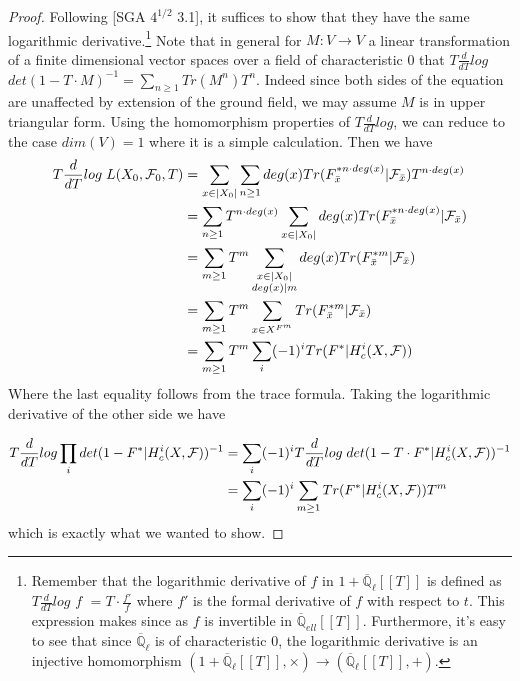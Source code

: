 \documentclass{ucbthesis}
\theoremstyle{definition}
\theoremstyle{theorem}
\begin{document}
\begin{proof}
Following [SGA $4^{1/2}$ 3.1], it suffices to show that they have the same logarithmic derivative.\footnote{Remember that the logarithmic derivative of $f$ in $1+\overline{\mathbb{Q}}_{\ell}[[T]]$ is defined as $T \frac{d}{dT}log$ $f$ $=T\cdot \frac{f'}{f}$ where $f'$ is the formal derivative of $f$ with respect to $t$. This expression makes since as $f$ is invertible in $\overline{\mathbb{Q}}_{ell}[[T]]$. Furthermore, it's easy to see that since $\overline{\mathbb{Q}}_{\ell}$ is of characteristic $0$, the logarithmic derivative is an injective homomorphism $(1+\overline{\mathbb{Q}}_{\ell}[[T]],\times) \rightarrow (\overline{\mathbb{Q}}_{\ell}[[T]],+)$.}
Note that in general for $M:V\rightarrow V$ a linear transformation of a finite dimensional vector spaces over a field of characteristic $0$ that  
$T \frac{d}{dT}log$ $det(1-T\cdot M)^{-1} = \sum\limits_{n \geq 1}Tr(M^{n})T^{n}$. Indeed since both sides of the equation are unaffected by extension of the ground field, we may assume $M$ is in upper triangular form. Using the homomorphism properties of $T \frac{d}{dT}log$, we can reduce to the case $dim(V) =1$ where it is a simple calculation. Then we have
\begin{align*}
T \frac{d}{dT}log \hspace{1mm} L(X_{0},\mathcal{F}_0,T) & = \sum\limits_{x\in |X_0|}\sum\limits_{n\geq 1}deg(x)Tr(F_{\bar{x}}^{*n\cdot deg(x)}|\mathcal{F}_{\bar{x}})T^{n\cdot deg(x)} \\
& = \sum\limits_{n\geq 1}T^{n\cdot deg(x)}\sum\limits_{x\in |X_{0}|}deg(x)Tr(F_{\bar{x}}^{*n\cdot deg(x)}|\mathcal{F}_{\bar{x}})\\
& = \sum\limits_{m\geq 1}T^{m}\sum\limits_{\substack{x\in |X_{0}|\\ deg(x)|m}}deg(x)Tr(F_{\bar{x}}^{*m}|\mathcal{F}_{\bar{x}}) \\
&=\sum\limits_{m\geq 1}T^{m}\sum\limits_{x\in X^{F^{m}}}Tr(F_{\bar{x}}^{*m}|\mathcal{F}_{\bar{x}}) \\
& = \sum\limits_{m\geq 1}T^{m}\sum\limits_{i}(-1)^{i}Tr(F^{*}|H^{i}_{c}(X,\mathcal{F})) 
\end{align*}
Where the last equality follows from the trace formula. Taking the logarithmic derivative of the other side we have

\begin{align*}
T \frac{d}{dT}log \prod\limits_{i}det(1-F^{*}|H^{i}_{c}(X,\mathcal{F}))^{-1}
&= \sum\limits_{i}(-1)^{i}T \frac{d}{dT}log \hspace{1mm} det(1-T\cdot F^{*}|H^{i}_{c}(X,\mathcal{F}))^{-1} \\
&= \sum\limits_{i}(-1)^{i}\sum\limits_{m\geq 1} Tr(F^{*}|H^{i}_{c}(X,\mathcal{F}))T^{m}
\end{align*}
which is exactly what we wanted to show. 
\end{proof}
\end{document}
